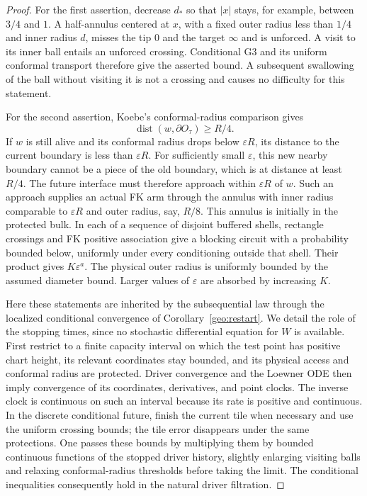 \begin{proof}
For the first assertion, decrease $d_*$ so that $|x|$ stays, for example,
between $3/4$ and $1$.  A half-annulus centered at $x$, with a fixed outer
radius less than $1/4$ and inner radius $d$, misses the tip $0$ and the
target $\infty$ and is unforced.  A visit to its inner ball entails an
unforced crossing.  Conditional G3 and its uniform conformal transport
therefore give the asserted bound.  A subsequent swallowing of the ball
without visiting it is not a crossing and causes no difficulty for this
statement.

For the second assertion, Koebe's conformal-radius comparison gives
\[
 \operatorname{dist}(w,\partial O_\tau)\ge R/4.
\]
If $w$ is still alive and its conformal radius drops below
$\varepsilon R$, its distance to the current boundary is less than
$\varepsilon R$.  For sufficiently small $\varepsilon$, this new nearby
boundary cannot be a piece of the old boundary, which is at distance at
least $R/4$.  The future interface must therefore approach within
$\varepsilon R$ of $w$.  Such an approach supplies an actual FK arm
through the annulus with inner radius comparable to $\varepsilon R$ and
outer radius, say, $R/8$.  This annulus is initially in the protected bulk.
In each of a sequence of disjoint buffered shells, rectangle crossings
and FK positive association give a blocking circuit with a probability
bounded below, uniformly under every conditioning outside that shell.
Their product gives $K\varepsilon^a$.  The physical outer radius is
uniformly bounded by the assumed diameter bound.  Larger values of
$\varepsilon$ are absorbed by increasing $K$.

Here these statements are inherited by the subsequential law through
the localized conditional convergence of Corollary~\ref{geo:restart}.
We detail the role of the stopping times, since no stochastic
differential equation for $W$ is available.  First restrict to a finite
capacity interval on which the test point has positive chart height,
its relevant coordinates stay bounded, and its physical access and
conformal radius are protected.  Driver convergence and the Loewner ODE
then imply convergence of its coordinates, derivatives, and point
clocks.  The inverse clock is continuous on such an interval because
its rate is positive and continuous.  In the discrete conditional
future, finish the current tile when necessary and use the uniform
crossing bounds; the tile error disappears under the same protections.
One passes these bounds by multiplying them by bounded continuous
functions of the stopped driver history, slightly enlarging visiting
balls and relaxing conformal-radius thresholds before taking the limit.
The conditional inequalities consequently hold in the natural driver
filtration.


\end{proof}
